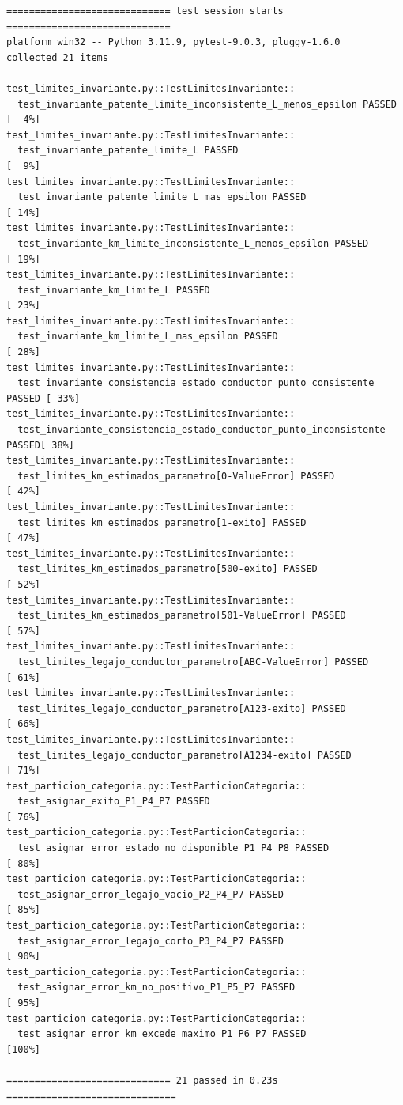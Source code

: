 \begin{verbatim}
============================= test session starts =============================
platform win32 -- Python 3.11.9, pytest-9.0.3, pluggy-1.6.0
collected 21 items

test_limites_invariante.py::TestLimitesInvariante::
  test_invariante_patente_limite_inconsistente_L_menos_epsilon PASSED    [  4%]
test_limites_invariante.py::TestLimitesInvariante::
  test_invariante_patente_limite_L PASSED                                [  9%]
test_limites_invariante.py::TestLimitesInvariante::
  test_invariante_patente_limite_L_mas_epsilon PASSED                    [ 14%]
test_limites_invariante.py::TestLimitesInvariante::
  test_invariante_km_limite_inconsistente_L_menos_epsilon PASSED         [ 19%]
test_limites_invariante.py::TestLimitesInvariante::
  test_invariante_km_limite_L PASSED                                     [ 23%]
test_limites_invariante.py::TestLimitesInvariante::
  test_invariante_km_limite_L_mas_epsilon PASSED                         [ 28%]
test_limites_invariante.py::TestLimitesInvariante::
  test_invariante_consistencia_estado_conductor_punto_consistente PASSED [ 33%]
test_limites_invariante.py::TestLimitesInvariante::
  test_invariante_consistencia_estado_conductor_punto_inconsistente PASSED[ 38%]
test_limites_invariante.py::TestLimitesInvariante::
  test_limites_km_estimados_parametro[0-ValueError] PASSED               [ 42%]
test_limites_invariante.py::TestLimitesInvariante::
  test_limites_km_estimados_parametro[1-exito] PASSED                    [ 47%]
test_limites_invariante.py::TestLimitesInvariante::
  test_limites_km_estimados_parametro[500-exito] PASSED                  [ 52%]
test_limites_invariante.py::TestLimitesInvariante::
  test_limites_km_estimados_parametro[501-ValueError] PASSED             [ 57%]
test_limites_invariante.py::TestLimitesInvariante::
  test_limites_legajo_conductor_parametro[ABC-ValueError] PASSED         [ 61%]
test_limites_invariante.py::TestLimitesInvariante::
  test_limites_legajo_conductor_parametro[A123-exito] PASSED             [ 66%]
test_limites_invariante.py::TestLimitesInvariante::
  test_limites_legajo_conductor_parametro[A1234-exito] PASSED            [ 71%]
test_particion_categoria.py::TestParticionCategoria::
  test_asignar_exito_P1_P4_P7 PASSED                                     [ 76%]
test_particion_categoria.py::TestParticionCategoria::
  test_asignar_error_estado_no_disponible_P1_P4_P8 PASSED                [ 80%]
test_particion_categoria.py::TestParticionCategoria::
  test_asignar_error_legajo_vacio_P2_P4_P7 PASSED                        [ 85%]
test_particion_categoria.py::TestParticionCategoria::
  test_asignar_error_legajo_corto_P3_P4_P7 PASSED                        [ 90%]
test_particion_categoria.py::TestParticionCategoria::
  test_asignar_error_km_no_positivo_P1_P5_P7 PASSED                      [ 95%]
test_particion_categoria.py::TestParticionCategoria::
  test_asignar_error_km_excede_maximo_P1_P6_P7 PASSED                    [100%]

============================= 21 passed in 0.23s ==============================
\end{verbatim}

